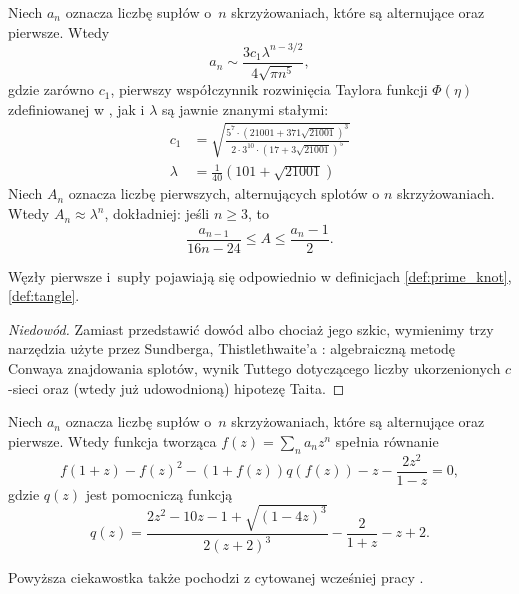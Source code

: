 \begin{proposition}
%
    Niech $a_n$ oznacza liczbę supłów o~$n$ skrzyżowaniach, które są alternujące oraz pierwsze.
    Wtedy
    \begin{equation}
        a_n \sim \frac{3c_1 \lambda^{n-3/2}}{4\sqrt{\pi n^{5}}},
    \end{equation}
    gdzie zarówno $c_1$, pierwszy współczynnik rozwinięcia Taylora funkcji $\Phi(\eta)$ zdefiniowanej w \cite{sundberg1998}, jak i $\lambda$ są jawnie znanymi stałymi:
    \begin{align}
        c_1 & = \sqrt{\frac{5^7 \cdot (21001 + 371 \sqrt{21001})^3}{2 \cdot 3^{10} \cdot (17 + 3\sqrt{21001})^5}} \\
        \lambda & = \frac {1}{40} (101 + \sqrt{21001})
    \end{align}
    Niech $A_n$ oznacza liczbę pierwszych, alternujących splotów o $n$ skrzyżowaniach.
    Wtedy $A_n \approx \lambda^n$, dokładniej: jeśli $n \ge 3$, to
    \begin{equation}
        \frac{a_{n-1}}{16n - 24} \le A \le \frac{a_n - 1}{2}.
    \end{equation}
\end{proposition}

Węzły pierwsze i~supły pojawiają się odpowiednio w definicjach \ref{def:prime_knot}, \ref{def:tangle}.

\begin{proof}[Niedowód]
%
%
    Zamiast przedstawić dowód albo chociaż jego szkic, wymienimy trzy narzędzia użyte przez Sundberga, Thistlethwaite'a \cite{sundberg1998}:
    algebraiczną metodę Conwaya znajdowania splotów,
    wynik Tuttego dotyczącego liczby ukorzenionych $c$-sieci
    oraz (wtedy już udowodnioną) hipotezę Taita.
%
%
%
\end{proof}

\begin{proposition}
    Niech $a_n$ oznacza liczbę supłów o~$n$ skrzyżowaniach, które są alternujące oraz pierwsze.
    Wtedy funkcja tworząca $f(z) = \sum_n a_n z^n$ spełnia równanie
    \begin{equation}
    f(1+z) - f(z)^2 - (1+f(z))q(f(z)) -z - \frac{2z^2}{1-z} = 0,
    \end{equation}
    gdzie $q(z)$ jest pomocniczą funkcją
    \begin{equation}
        q(z) = \frac{2z^2 - 10z - 1 + \sqrt{(1-4z)^3}} {2(z+2)^3} - \frac{2}{1+z} -z + 2.
    \end{equation}
\end{proposition}

Powyższa ciekawostka także pochodzi z cytowanej wcześniej pracy \cite{sundberg1998}.

